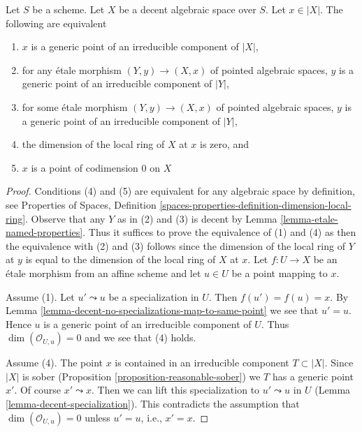 \begin{lemma}
\label{lemma-decent-generic-points}
Let $S$ be a scheme. Let $X$ be a decent algebraic space over $S$.
Let $x \in |X|$. The following are equivalent
\begin{enumerate}
\item $x$ is a generic point of an irreducible component of $|X|$,
\item for any \'etale morphism $(Y, y) \to (X, x)$ of pointed algebraic
spaces, $y$ is a generic point of an irreducible component of $|Y|$,
\item for some \'etale morphism $(Y, y) \to (X, x)$ of pointed algebraic
spaces, $y$ is a generic point of an irreducible component of $|Y|$,
\item the dimension of the local ring of $X$ at $x$ is zero, and
\item $x$ is a point of codimension $0$ on $X$
\end{enumerate}
\end{lemma}

\begin{proof}
Conditions (4) and (5) are equivalent for any algebraic space
by definition, see Properties of Spaces, Definition
\ref{spaces-properties-definition-dimension-local-ring}.
Observe that any $Y$ as in (2) and (3) is decent by
Lemma \ref{lemma-etale-named-properties}.
Thus it suffices to prove the equivalence of (1) and (4)
as then the equivalence with (2) and (3) follows since the dimension
of the local ring of $Y$ at $y$ is equal to the dimension
of the local ring of $X$ at $x$.
Let $f : U \to X$ be an \'etale morphism from an affine scheme and let
$u \in U$ be a point mapping to $x$.

\medskip\noindent
Assume (1). Let $u' \leadsto u$ be a specialization in $U$.
Then $f(u') = f(u) = x$. By
Lemma \ref{lemma-decent-no-specializations-map-to-same-point}
we see that $u' = u$. Hence $u$ is a generic point of an irreducible component
of $U$. Thus $\dim(\mathcal{O}_{U, u}) = 0$ and we see that (4) holds.

\medskip\noindent
Assume (4). The point $x$ is contained in an irreducible component
$T \subset |X|$. Since $|X|$ is sober
(Proposition \ref{proposition-reasonable-sober})
we $T$ has a generic point $x'$. Of course $x' \leadsto x$.
Then we can lift this specialization to $u' \leadsto u$ in $U$
(Lemma \ref{lemma-decent-specialization}). This contradicts the assumption
that $\dim(\mathcal{O}_{U, u}) = 0$ unless $u' = u$, i.e., $x' = x$.
\end{proof}

